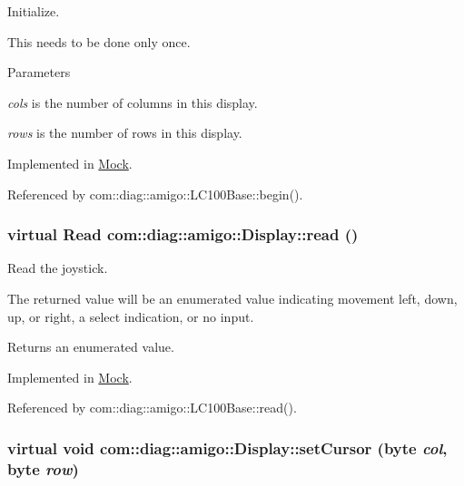 Initialize. 

This needs to be done only once. 
\begin{DoxyParams}{Parameters}
\item[{\em cols}]is the number of columns in this display. \item[{\em rows}]is the number of rows in this display. \end{DoxyParams}


Implemented in \hyperlink{classMock_abe7c9964a0b81f8bef519f744b700ea5}{Mock}.



Referenced by com::diag::amigo::LC100Base::begin().

\hypertarget{structcom_1_1diag_1_1amigo_1_1Display_ac630c8e1bbb3ce3091e6db01e1c383e7}{
\subsubsection[{read}]{\setlength{\rightskip}{0pt plus 5cm}virtual {\bf Read} com::diag::amigo::Display::read ()}}
\label{structcom_1_1diag_1_1amigo_1_1Display_ac630c8e1bbb3ce3091e6db01e1c383e7}


Read the joystick. 

The returned value will be an enumerated value indicating movement left, down, up, or right, a select indication, or no input. \begin{DoxyReturn}{Returns}
an enumerated value. 
\end{DoxyReturn}


Implemented in \hyperlink{classMock_a0fb6d589bee9e919766e1bb17076351c}{Mock}.



Referenced by com::diag::amigo::LC100Base::read().

\hypertarget{structcom_1_1diag_1_1amigo_1_1Display_ab5356a375bc24de2be5ce1b05bd9fd56}{
\subsubsection[{setCursor}]{\setlength{\rightskip}{0pt plus 5cm}virtual void com::diag::amigo::Display::setCursor (byte {\em col}, \/  byte {\em row})}}
\label{structcom_1_1diag_1_1amigo_1_1Display_ab5356a375bc24de2be5ce1b05bd9fd56}



